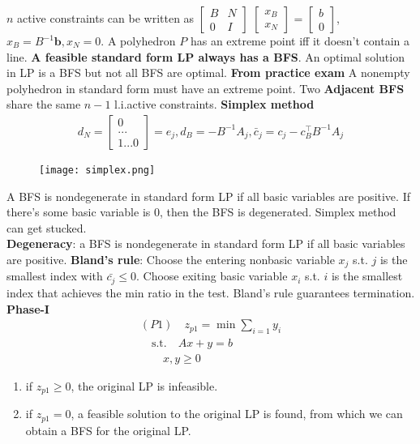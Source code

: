 \documentclass{article}
\def\b{\bm{b}}
\begin{document}
$n$ active constraints can be written as $\begin{bmatrix} B & N \\ 0 & I \end{bmatrix}$ $\begin{bmatrix} x_B \\ x_N \end{bmatrix}$ = $\begin{bmatrix} b \\ 0 \end{bmatrix} $, $x_B=B^{-1}\b, x_N=0$.
A polyhedron $P$ has an extreme point iff it doesn't contain a line. \textbf{A feasible standard form LP always has a BFS}. 
An optimal solution in LP is a BFS but not all BFS are optimal.
\textbf{From practice exam} A nonempty polyhedron in standard form must have an extreme point.
Two \textbf{Adjacent BFS} share the same $n-1$ l.i.active constraints.
\textbf{Simplex method}
\begin{align*}
    d_N = \begin{bmatrix}
        0 \\...\\1...0
    \end{bmatrix} = e_j,
    d_B = -B^{-1}A_j,
    \bar{c}_j = c_j - c_B^{\top}B^{-1}A_j
\end{align*}
\begin{figure}[!ht]
    \centering
    \texttt{[image: simplex.png]}
\end{figure}
A BFS is nondegenerate in standard form LP if all basic variables are positive. If there's some basic variable is 0, then the BFS is degenerated. Simplex method can get stucked.\\
\textbf{Degeneracy}: a BFS is nondegenerate in standard form	LP if all basic	variables are positive.
\textbf{Bland's rule}: Choose the entering nonbasic variable $x_j$ s.t. $j$ is the smallest index with $\bar{c_j}\le 0$. Choose exiting basic variable $x_i$ s.t. $i$ is the smallest index that achieves the min ratio in the test. Bland's rule guarantees termination.
\textbf{Phase-I}
\begin{align*}
    (P1) \quad z_{p1} = \min \sum_{i=1} y_{i} \\
    \quad \text{s.t.} \quad Ax + y = b \\
    \quad \quad x, y \ge 0
\end{align*}
\begin{enumerate}
    \item if $z_{p1} \ge 0$, the original LP is infeasible.
    \item if $z_{p1}=0$, a feasible solution to the original LP is found, from which we can obtain a BFS for the original LP.
\end{enumerate}
\end{document}
